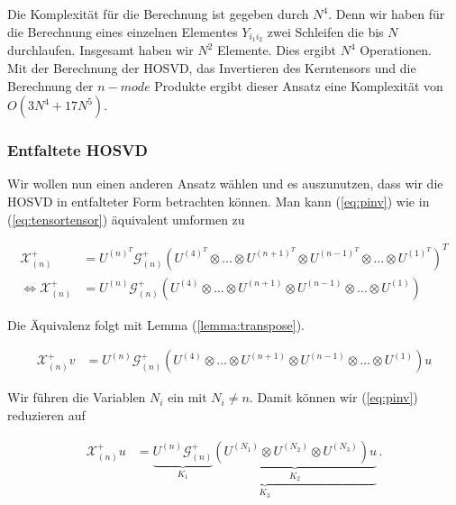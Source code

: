 Die Komplexität für die Berechnung ist gegeben durch $N^4$. Denn wir haben für die Berechnung eines einzelnen Elementes $Y_{i_1 i_2}$ zwei Schleifen die bis $N$ durchlaufen. Insgesamt haben wir $N^2$ Elemente. Dies ergibt $N^4$ Operationen. \\
Mit der Berechnung der HOSVD, das Invertieren des Kerntensors und die Berechnung der $n-mode$ Produkte ergibt dieser Ansatz eine Komplexität von $O(3N^4 + 17N^5)$. \\

\subsubsection{Entfaltete HOSVD}
Wir wollen nun einen anderen Ansatz wählen und es auszunutzen, dass wir die HOSVD in entfalteter Form betrachten können.
Man kann (\ref{eq:pinv}) wie in (\ref{eq:tensortensor}) äquivalent umformen zu

\begin{equation}
\begin{aligned}
\mathscr{X}^{+}_{(n)}  &= U^{ (n) ^{T} }  \mathscr{G}^{+}_{(n)} ( U^{ (4) ^{T} } \otimes \dots \otimes U^{ (n+1) ^{T} } \otimes U^{ (n-1) ^{T} } \otimes \dots \otimes U^{ (1) ^{T} })^{T} \\ \iff
\mathscr{X}^{+}_{(n)} &= U^{ (n)  }  \mathscr{G}^{+}_{(n)} ( U^{ (4)  } \otimes \dots \otimes U^{ (n+1) } \otimes U^{ (n-1) } \otimes \dots \otimes U^{ (1) })
\end{aligned}
\end{equation}

Die Äquivalenz folgt mit Lemma (\ref{lemma:transpose}).

\begin{equation} \label{eq:pinvv}
\begin{aligned}
\mathscr{X}^{+}_{(n)}v&= U^{ (n)  }  \mathscr{G}^{+}_{(n)} ( U^{ (4)  } \otimes \dots \otimes U^{ (n+1) } \otimes U^{ (n-1) } \otimes \dots \otimes U^{ (1) }) u
\end{aligned}
\end{equation}

Wir führen die Variablen $N_i$ ein mit $N_i \neq n$. Damit können wir (\ref{eq:pinv}) reduzieren auf

\begin{equation} \label{eq:pinvcase}
\begin{aligned}
\mathscr{X}^{+}_{(n)} u&= \underbrace{\underbrace{U^{ (n) }  \mathscr{G}^{+}_{(n)}}_{K_1} \underbrace{( U^{ (N_{1})  } \otimes U^{ (N_{2})}  \otimes U^{ (N_{3}) }) u}_{K_2}}_{K_3} \,.
\end{aligned}
\end{equation}
 

